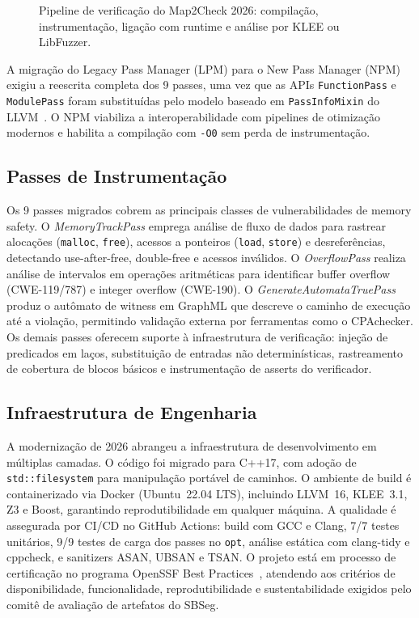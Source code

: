 \documentclass[12pt]{article}
\newcommand{\UnitTests}{7/7}
\newcommand{\PassTests}{9/9}
\newcommand{\CountPasses}{9}
\newcommand{\LLVMVersion}{16}
\newcommand{\KLEEVersion}{3.1}
\newcommand{\CppStandard}{C++17}
\newcommand{\DockerBase}{Ubuntu~22.04}
\begin{document}
\begin{figure}[ht]
\centering

\caption{Pipeline de verificação do Map2Check 2026: compilação, instrumentação, ligação com runtime e análise por KLEE ou LibFuzzer.}
\label{fig:pipeline}
\end{figure}

A migração do Legacy Pass Manager (LPM) para o New Pass Manager (NPM) exigiu a reescrita completa dos \CountPasses{} passes, uma vez que as APIs \texttt{FunctionPass} e \texttt{ModulePass} foram substituídas pelo
modelo baseado em \texttt{PassInfoMixin} do LLVM~\cite{lattner:2004}. O NPM viabiliza a interoperabilidade com pipelines de otimização modernos e habilita a compilação com \texttt{-O0} sem perda de instrumentação.

\subsection{Passes de Instrumentação}
\label{subsec:passes}

Os \CountPasses{} passes migrados cobrem as principais classes de vulnerabilidades de memory safety. O \textit{MemoryTrackPass} emprega análise de fluxo de dados para rastrear alocações (\texttt{malloc},
\texttt{free}), acessos a ponteiros (\texttt{load}, \texttt{store}) e desreferências, detectando use-after-free, double-free e acessos inválidos. O \textit{OverflowPass} realiza análise de intervalos em operações aritméticas para identificar buffer overflow (CWE-119/787) e integer overflow (CWE-190). O \textit{GenerateAutomataTruePass} produz o autômato de witness em GraphML que descreve o caminho de execução até a violação, permitindo validação externa por ferramentas como o CPAchecker. Os demais passes oferecem suporte à infraestrutura de verificação: injeção de predicados em laços, substituição de entradas não determinísticas, rastreamento de cobertura de blocos básicos e instrumentação de asserts do verificador.

\subsection{Infraestrutura de Engenharia}
\label{subsec:engenharia}

A modernização de 2026 abrangeu a infraestrutura de desenvolvimento em múltiplas camadas. O código foi migrado para \CppStandard{}, com adoção de \texttt{std::filesystem} para manipulação portável de caminhos. O ambiente
de build é containerizado via Docker (\DockerBase{} LTS), incluindo LLVM~\LLVMVersion, KLEE~\KLEEVersion, Z3 e Boost, garantindo reprodutibilidade em qualquer máquina. A qualidade é assegurada por CI/CD no GitHub Actions: build com GCC e Clang, \UnitTests{} testes unitários, \PassTests{} testes de carga dos passes no \texttt{opt}, análise estática com clang-tidy e cppcheck, e sanitizers ASAN, UBSAN e TSAN. O projeto está em processo de certificação no programa OpenSSF Best Practices~\cite{openssf2024}, atendendo aos critérios de disponibilidade,
funcionalidade, reprodutibilidade e sustentabilidade exigidos pelo comitê de avaliação de artefatos do SBSeg.
\end{document}
